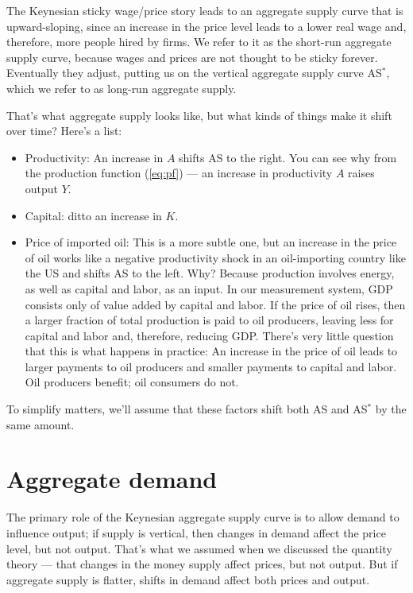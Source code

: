 The Keynesian sticky wage/price story leads to
an aggregate supply curve that is upward-sloping,
since an increase in the price level leads to a lower
real wage and, therefore, more people hired by firms.
We refer to it as the short-run aggregate supply curve,
because wages and prices are not thought to be sticky forever.
Eventually they adjust, putting us on the vertical aggregate
supply curve AS$^*$,
which we refer to as long-run aggregate supply.


That's what aggregate supply looks like,
but what kinds of things make it shift over time?
Here's a list:
%
\begin{itemize}
\item Productivity:  An increase in $A$ shifts AS to the right.
You can see why from the production function (\ref{eq:pf}) --- an increase in productivity $A$ raises output $Y$.


\item Capital:  ditto an increase in $K$.
\item Price of imported oil:  This is a more subtle one, but
an increase in the price of oil works like a negative productivity shock
in an oil-importing country like the US and shifts AS to the left.
Why?  Because production involves energy, as well as capital and labor, as an input.
In our measurement system, GDP consists only of value added by capital
and labor.
If the price of oil rises, then a larger fraction of total production
is paid to oil producers, leaving less for capital and labor and, therefore, reducing GDP.
There's very little question that this is what happens in practice: An increase in the price of oil leads to larger payments to oil producers
and smaller payments to capital and labor.
Oil producers benefit; oil consumers do not.
\end{itemize}
%
To simplify matters, we'll assume that these factors shift both AS and AS$^*$
by the same amount.


\section{Aggregate demand}


The primary role of the Keynesian aggregate supply curve is to
allow demand to influence output;
if supply is vertical, then changes in demand affect the price level,
but not output.
That's what we assumed when we discussed the quantity theory --- that changes in the money supply affect prices, but not output.
But if aggregate supply is flatter,
shifts in demand affect both prices and output.

